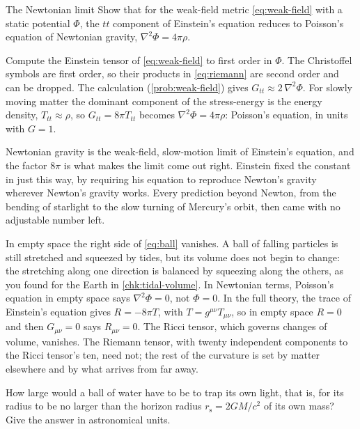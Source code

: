 \begin{example}[label=ex:newtonian, unbreakable]{The Newtonian limit}
Show that for the weak-field metric \cref{eq:weak-field} with a static
potential $\Phi$, the $tt$ component of Einstein's equation reduces to Poisson's
equation of Newtonian gravity, $\nabla^{2}\Phi = 4\pi\rho$.

\solution Compute the Einstein tensor of \cref{eq:weak-field} to first order in
$\Phi$. The Christoffel symbols are first order, so their products in
\cref{eq:riemann} are second order and can be dropped. The calculation
(\cref{prob:weak-field}) gives $G_{tt} \approx 2\,\nabla^{2}\Phi$. For slowly
moving matter the dominant component of the stress-energy is the energy
density, $T_{tt} \approx \rho$, so $G_{tt} = 8\pi T_{tt}$ becomes
$\nabla^{2}\Phi = 4\pi\rho$: Poisson's equation, in units with $G = 1$.

\discussion Newtonian gravity is the weak-field, slow-motion limit of
Einstein's equation, and the factor $8\pi$ is what makes the limit come out
right. Einstein fixed the constant in just this way, by requiring his equation
to reproduce Newton's gravity wherever Newton's gravity works. Every
prediction beyond Newton, from the bending of starlight to the slow turning of
Mercury's orbit, then came with no adjustable number left.
\end{example}

In empty space the right side of \cref{eq:ball} vanishes. A ball of falling
particles is still stretched and squeezed by tides, but its volume does not
begin to change: the stretching along one direction is balanced by squeezing
along the others, as you found for the Earth in \cref{chk:tidal-volume}. In
Newtonian terms, Poisson's equation in empty space says $\nabla^{2}\Phi = 0$,
not $\Phi = 0$. In the full theory, the trace of Einstein's equation gives
$R = -8\pi T$, with $T = g^{\mu\nu}T_{\mu\nu}$, so in empty space $R = 0$ and
then $G_{\mu\nu} = 0$ says $R_{\mu\nu} = 0$. The Ricci tensor, which governs
changes of volume, vanishes. The Riemann tensor, with twenty independent
components to the Ricci tensor's ten, need not; the rest of the curvature is
set by matter elsewhere and by what arrives from far away.

\begin{checkpoint}[label=chk:water]
How large would a ball of water have to be to trap its own light, that is, for
its radius to be no larger than the horizon radius $r_{\mathrm{s}} = 2GM/c^{2}$
of its own mass? Give the answer in astronomical units.
\end{checkpoint}


